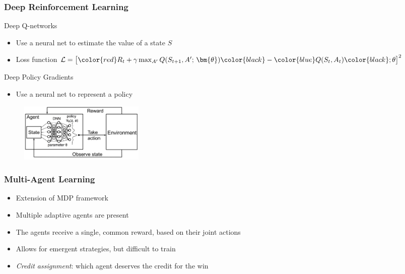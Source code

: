 \documentclass{beamer}
\begin{document}
\begin{frame}
\frametitle{Deep Reinforcement Learning}
\begin{block}{Deep Q-networks}
\begin{itemize}
    \item Use a neural net to estimate the value of a state $S$
    \item Loss function $\mathcal{L} = \big [ \color{red} R_t + \gamma \max_{A'} Q(S_{t+1}, A';\, \bm{\theta}) \color{black} - \color{blue} Q(S_t, A_t) \color{black}; \theta \big ]^2$
\end{itemize}
\end{block}
\begin{block}{Deep Policy Gradients}
\begin{itemize}
    \item Use a neural net to represent a policy
\end{itemize}
\begin{figure}[htp]
    \centering
    \includegraphics[width=6cm]{images/deep_pg.png}
\end{figure}
\end{block}
\end{frame}

\begin{frame}
\frametitle{Multi-Agent Learning}
\begin{itemize}
    \item Extension of MDP framework
    \item Multiple adaptive agents are present
    \item The agents receive a single, common reward, based on their joint actions
    \item Allows for emergent strategies, but difficult to train
    \item \emph{Credit assignment}: which agent deserves the credit for the win
\end{itemize}
\end{frame}
\end{document}
